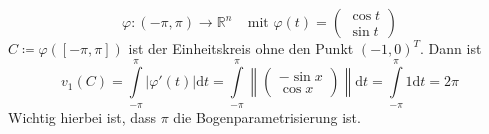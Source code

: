 \begin{beispiel}
\begin{equation*}
	\varphi:\left(-\pi,\pi\right)\rightarrow\mathbb{R}^n 
	\ \ \ \ \ \text{mit\ } \varphi(t)=\begin{pmatrix}
	\cos t \\ \sin t
	\end{pmatrix}
\end{equation*}
$C\coloneqq \varphi([-\pi,\pi])$ ist der Einheitskreis ohne den Punkt $(-1,0)^T$. 
Dann ist 
\begin{equation*}
	v_1(C)=\int\limits_{-\pi}^{\pi}|\varphi'(t)|\mathrm{d}t=\int\limits_{-\pi}^{\pi}\left\|\begin{pmatrix}
	-\sin x \\ \cos x
	\end{pmatrix}\right\|\mathrm{d}t = 
	\int\limits_{-\pi}^{\pi}1\mathrm{d}t=2\pi
\end{equation*}
Wichtig hierbei ist, dass $\pi$ die Bogenparametrisierung ist.
\end{beispiel}